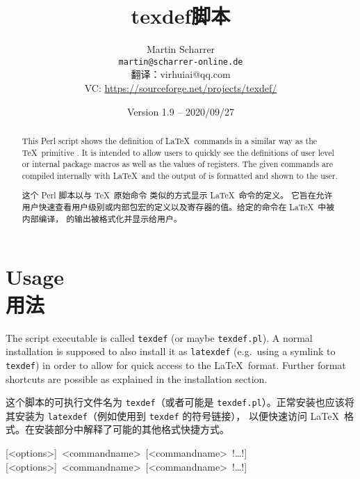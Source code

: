 \documentclass{article}
\title{\textsf{texdef}脚本}
\author{Martin Scharrer \\
\texttt{martin@scharrer-online.de}\\
翻译：virhuiai@qq.com\\
VC: \url{https://sourceforge.net/projects/texdef/}\\[-1.5em]
}
\date{Version 1.9 -- 2020/09/27}
\begin{document}
\parindent=0pt
\maketitle


\begin{abstract}
\noindent
This Perl script shows the definition of \LaTeX\ commands in a similar way as the \TeX\ primitive \Macro\show.
It is intended to allow users to quickly see the definitions of user level or internal package macros as well as the
values of registers. The given commands are compiled internally with \LaTeX\ and the output of \Macro\show is formatted
and shown to the user.

\noindent
这个 Perl 脚本以与 \TeX\ 原始命令 \Macro\show 类似的方式显示 \LaTeX\ 命令的定义。
它旨在允许用户快速查看用户级别或内部包宏的定义以及寄存器的值。给定的命令在 \LaTeX\ 中被内部编译，
\Macro\show 的输出被格式化并显示给用户。
\end{abstract}

\section{Usage\\用法}

The script executable is called \texttt{texdef} (or maybe \texttt{texdef.pl}).
A normal installation is supposed to also install it as \texttt{latexdef} (e.g.\ using a symlink to \texttt{texdef}) in order to 
allow for quick access to the \LaTeX\ format. Further format shortcuts are possible as explained in the installation section.

这个脚本的可执行文件名为 \texttt{texdef}（或者可能是 \texttt{texdef.pl}）。正常安装也应该将其安装为 \texttt{latexdef}（例如使用到 \texttt{texdef} 的符号链接），
以便快速访问 \LaTeX\ 格式。在安装部分中解释了可能的其他格式快捷方式。

\parindent=0pt
[<options>]~<commandname>~[<commandname>~!\ldots!]
[<options>]~<commandname>~[<commandname>~!\ldots!]
\end{document}
